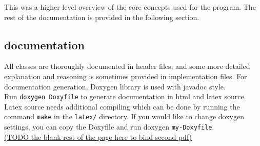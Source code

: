 \documentclass{elteikthesis}[2018/06/06]
\begin{document}
This was a higher-level overview of the core concepts used for the program. The rest of the documentation is provided in the following section. \\
\subsection{documentation}
\label{sec-3-2-4}
All classes are thoroughly documented in header files, and some more detailed explanation and reasoning is sometimes provided in implementation files. For documentation generation, Doxygen library is used with javadoc style. \\

Run \texttt{doxygen Doxyfile} to generate documentation in html and latex source. Latex source needs additional compiling which can be done by running the command \texttt{make} in the \texttt{latex/} directory. If you would like to change doxygen settings, you can copy the Doxyfile and run doxygen \texttt{my-Doxyfile}. \\

\uline{(TODO the blank rest of the page here to bind second pdf)} \\
\end{document}
